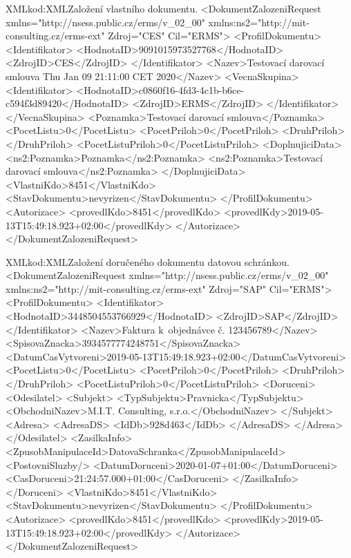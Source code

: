 \documentclass[
  master,
  field=ainfp,
  biblatex,
  language=czech,
  glossaries,
  theorems=false,
  index
]{kidiplom}
\begin{document}
\begin{kicode}{XML}{kod:XML}{Založení vlastního dokumentu.}
<DokumentZalozeniRequest xmlns="http://nsess.public.cz/erms/v_02_00" 
    xmlns:ns2="http://mit-consulting.cz/erms-ext" Zdroj="CES" Cil="ERMS">
    <ProfilDokumentu>
        <Identifikator>
            <HodnotaID>9091015973527768</HodnotaID>
            <ZdrojID>CES</ZdrojID>
        </Identifikator>
        <Nazev>Testovací darovací smlouva Thu Jan 09 21:11:00 CET 2020</Nazev>
        <VecnaSkupina>
            <Identifikator>
                <HodnotaID>c0860f16-4fd3-4c1b-b6ce-c594f3d89420</HodnotaID>
                <ZdrojID>ERMS</ZdrojID>
            </Identifikator>
        </VecnaSkupina>
        <Poznamka>Testovací darovací smlouva</Poznamka>
        <PocetListu>0</PocetListu>
        <PocetPriloh>0</PocetPriloh>
        <DruhPriloh></DruhPriloh>
        <PocetListuPriloh>0</PocetListuPriloh>
        <DoplnujiciData>
            <ns2:Poznamka>Poznamka</ns2:Poznamka>
            <ns2:Poznamka>Testovací darovací smlouva</ns2:Poznamka>
        </DoplnujiciData>
        <VlastniKdo>8451</VlastniKdo>
        <StavDokumentu>nevyrizen</StavDokumentu>
    </ProfilDokumentu>
    <Autorizace>
        <provedlKdo>8451</provedlKdo>
        <provedlKdy>2019-05-13T15:49:18.923+02:00</provedlKdy>
    </Autorizace>
</DokumentZalozeniRequest>
\end{kicode}

\begin{kicode}{XML}{kod:XML}{Založení doručeného dokumentu datovou schránkou.}
<DokumentZalozeniRequest xmlns="http://nsess.public.cz/erms/v_02_00" 
    xmlns:ns2="http://mit-consulting.cz/erms-ext" Zdroj="SAP" Cil="ERMS">
    <ProfilDokumentu>
        <Identifikator>
            <HodnotaID>3448504553766929</HodnotaID>
            <ZdrojID>SAP</ZdrojID>
        </Identifikator>
        <Nazev>Faktura k~objednávce č. 123456789</Nazev>
        <SpisovaZnacka>3934577774248751</SpisovaZnacka>
        <DatumCasVytvoreni>2019-05-13T15:49:18.923+02:00</DatumCasVytvoreni>
        <PocetListu>0</PocetListu>
        <PocetPriloh>0</PocetPriloh>
        <DruhPriloh></DruhPriloh>
        <PocetListuPriloh>0</PocetListuPriloh>
        <Doruceni>
            <Odesilatel>
                <Subjekt>
                    <TypSubjektu>Pravnicka</TypSubjektu>
                    <ObchodniNazev>M.I.T. Consulting, s.r.o.</ObchodniNazev>
                </Subjekt>
                <Adresa>
                    <AdresaDS>
                        <IdDb>928d463</IdDb>
                    </AdresaDS>
                </Adresa>
            </Odesilatel>
            <ZasilkaInfo>
                <ZpusobManipulaceId>DatovaSchranka</ZpusobManipulaceId>
                <PostovniSluzby/>
                <DatumDoruceni>2020-01-07+01:00</DatumDoruceni>
                <CasDoruceni>21:24:57.000+01:00</CasDoruceni>
            </ZasilkaInfo>
        </Doruceni>
        <VlastniKdo>8451</VlastniKdo>
        <StavDokumentu>nevyrizen</StavDokumentu>
    </ProfilDokumentu>
    <Autorizace>
        <provedlKdo>8451</provedlKdo>
        <provedlKdy>2019-05-13T15:49:18.923+02:00</provedlKdy>
    </Autorizace>
</DokumentZalozeniRequest>
\end{kicode}
\end{document}
